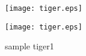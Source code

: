 \documentclass{jarticle}
\begin{document}
\begin{figure}[htbp]
    \begin{minipage}[c]{0.45\linewidth}
      \centering
      \texttt{[image: tiger.eps]}
    \end{minipage}
    \begin{minipage}[c]{0.45\linewidth}
      \centering
      \vspace{5mm}\texttt{[image: tiger.eps]}
    \end{minipage}
    \caption{sample tiger1}
    \centering
  \end{figure}
\end{document}
